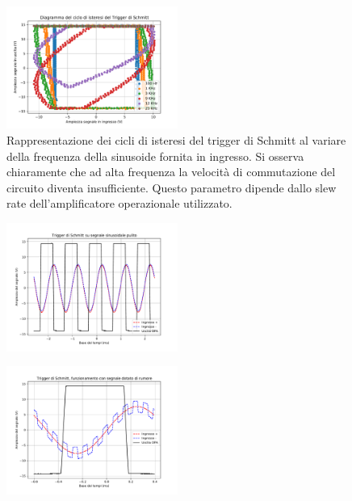 \documentclass[journal]{IEEEtran}
\begin{document}
\begin{figure}[H]%
\begin {center}
\includegraphics[width=0.50\textwidth]{analysis/output/OPA-trigger-histeresis-overlapped.pdf}
\caption{Rappresentazione dei cicli di isteresi del trigger di Schmitt al variare della frequenza della sinusoide fornita in ingresso. Si osserva chiaramente che ad alta frequenza la velocità di commutazione del circuito diventa insufficiente. Questo parametro dipende dallo slew rate dell'amplificatore operazionale utilizzato.}
\label{fig:trigger-hyst}
\end {center}
\end{figure}

\begin{figure}[H]%
\begin {center}
\includegraphics[width=0.50\textwidth]{analysis/output/trigger1.pdf}
\caption{}
\label{fig:trigger-hyst}
\end {center}
\end{figure}


\begin{figure}[H]%
\begin {center}
\includegraphics[width=0.50\textwidth]{analysis/output/trigger2.pdf}
\caption{}
\label{fig:trigger-hyst}
\end {center}
\end{figure}
\end{document}
